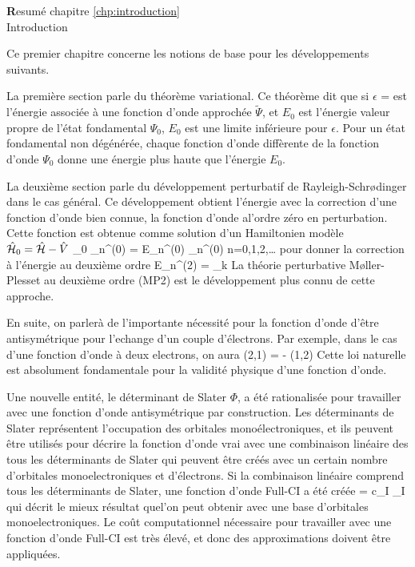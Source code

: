 \pagestyle{empty}
\begin{center}
{\Huge \textbf Resum\'e chapitre \ref{chp:introduction} \\ Introduction}
\end{center}
\vspace{10mm}

Ce premier chapitre concerne les notions de base pour les d\'eveloppements
suivants. 

La premi\`ere section parle du th\'eor\`eme variational. Ce th\'eor\`eme dit
que si $\epsilon$
\beq
\epsilon =
\frac{\braket{\tilde{\Psi}}{\ham}{\tilde{\Psi}}}{\integral{\tilde{\Psi}}{\tilde{\Psi}}}
\nonumber
\eeq
est l'\'energie associ\'ee \`a une fonction d'onde approch\'ee
$\tilde{\Psi}$, et $E_0$ est l'\'energie valeur propre de l'\'etat
fondamental $\Psi_0$, $E_0$ est une limite inf\'erieure pour $\epsilon$.
Pour un \'etat fondamental non d\'eg\'en\'er\'ee, chaque fonction d'onde
diff\`erente de la fonction d'onde $\Psi_0$ donne une \'energie plus haute
que l'\'energie $E_0$.

La deuxi\`eme section parle du d\'eveloppement perturbatif de
Rayleigh-Schr{\o}dinger dans le cas g\'en\'eral. Ce d\'eveloppement 
obtient l'\'energie avec la correction d'une fonction d'onde bien connue, la
fonction d'onde al'ordre z\'ero en perturbation. Cette fonction est obtenue
comme solution d'un Hamiltonien mod\`ele $\hat{\mathcal{H}}_{0} = \hat{\mathcal{H}} - \hat{V}$
\beq
\ham_{0} \Psi_n^{(0)} = E_n^{(0)} \Psi_n^{(0)} \quad n=0,1,2,\ldots
\nonumber
\eeq
pour donner la correction \`a l'\'energie au deuxi\`eme ordre
\beq
E_n^{(2)} = \sum_{k} 
\nonumber
\eeq
La th\'eorie perturbative M{\o}ller-Plesset au deuxi\`eme ordre (MP2) est le
d\'eveloppement plus connu de cette approche.

En suite, on parler\`a de l'importante n\'ecessit\'e pour la fonction d'onde
d'\^etre antisym\'etrique pour l'echange d'un couple d'\'electrons. Par
exemple, dans le cas d'une fonction d'onde \`a deux electrons, on aura
\beq
\Psi(2,1) = - \Psi(1,2) \nonumber
\eeq
Cette loi naturelle est absolument fondamentale pour la validit\'e physique
d'une fonction d'onde. 

Une nouvelle entit\'e, le d\'eterminant de Slater $\Phi$, a
\'et\'e rationalis\'ee pour travailler avec une fonction d'onde
antisym\'etrique par construction.  Les d\'eterminants de Slater
repr\'esentent l'occupation des orbitales mono\'electroniques, et ils peuvent
\^etre utilis\'es pour d\'ecrire la fonction d'onde vrai avec une
combinaison lin\'eaire des tous les d\'eterminants de Slater qui peuvent
\^etre cr\'e\'es avec un certain nombre d'orbitales monoelectroniques et
d'\'electrons.  Si la combinaison lin\'eaire comprend tous les
d\'eterminants de Slater, une fonction d'onde Full-CI a \'et\'e cr\'e\'ee
\beq
\Psi =  c_I \Phi_I
\nonumber
\eeq
qui d\'ecrit le mieux r\'esultat quel'on peut obtenir avec une base
d'orbitales monoelectroniques. Le co\^ut computationnel n\'ecessaire pour
travailler avec une fonction d'onde Full-CI est tr\`es \'elev\'e, et donc
des approximations doivent \^etre appliqu\'ees.

